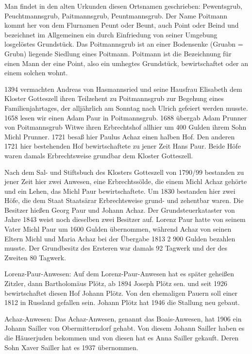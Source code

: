 \documentclass[12pt,a4pager]{book}
\begin{document}
Man findet in den alten Urkunden diesen Ortsnamen geschrieben: Pewentsgrub,
Peuchtmannsgrub, Paitmannsgrub, Peuntmannsgrub. Der Name Poitmann kommt her von
dem Flurnamen Peunt oder Beunt, auch Point oder Beind und bezeichnet im
Allgemeinen ein durch Einfriedung von seiner Umgebung losgelöstes Grundstück.
Das Poitmannsgrub ist an einer Bodensenke (Gruabn = Grubn) liegende Siedlung
eines Poitmann. Poitmann ist die Bezeichnung für einen Mann der eine Point, also
ein umhegtes Grundstück, bewirtschaftet oder an einem solchen wohnt.

1394 vermachten Andreas von Hasmannsried und seine Hausfrau Elisabeth dem
Kloster Gotteszell ihren Teilzehent zu Poitmannsgrub zur Begehung eines
Familienjahrtages, der alljährlich am Sonntag nach Ulrich gefeiert werden
musste. 1658 lesen wir einen Adam Paur in Poitmannsgrub. 1688 übergab Adam
Prunner von Poitmannsgrub Witwe ihren Erbrechtshof allhier um 400 Gulden ihrem
Sohn Michl Prunner. 1721 besaß hier Paulus Achaz einen halben Hof. Den anderen
1721 hier bestehenden Hof bewirtschaftete zu jener Zeit Hans Paur. Beide Höfe
waren damals Erbrechtsweise grundbar dem Kloster Gotteszell.

Nach dem Sal- und Stiftsbuch des Klosters Gotteszell von 1790/99 bestanden zu
jener Zeit hier zwei Anwesen, eine Erbrechtssölde, die einem Michl Achaz gehörte
und ein Lehen, das Michl Paur bewirtschaftete. Um 1830 bestanden hier zwei Höfe,
die dem Staat Staatsärar Erbrechtsweise grund- und zehentbar waren. Die Besitzer
hießen Georg Paur und Johann Achaz. Der Grundsteuerkataster von Jahre 1843 weist
noch dieselben zwei Besitzer auf. Lorenz Paur hatte von seinem Vater Michl Paur
um 1600 Gulden übernommen, während Achaz von seinen Eltern Michl und Maria Achaz
bei der Übergabe 1813 2 900 Gulden bezahlen musste. Der Grundbesitz des Ersteren
war damals 92 Tagwerk und der des Zweiten 80 Tagwerk.

Lorenz-Paur-Anwesen: Auf dem Lorenz-Paur-Anwesen hat es später geheißen Zitzler,
dann Bartholomäus Plötz, ab 1894 Joseph Plötz sen. und seit 1926 bewirtschaftet
diesen Hof Johann Plötz. Von den ehemaligen Pauern soll einer 1812 in Russland
gefallen sein. Johann Plötz hat 1946 die Stallung neu gebaut.

Achaz-Anwesen: Das Achaz-Anwesen, genannt das Boais-Anwesen, hat 1906 ein Johann
Sailler von Obermitterndorf gehabt. Von diesem Johann Sailler haben es die
Häuserjuden bekommen und von diesen hat es Anna Sailler gekauft. Deren Sohn
Xaver Sailler hat es 1937 übernommen.
\end{document}
